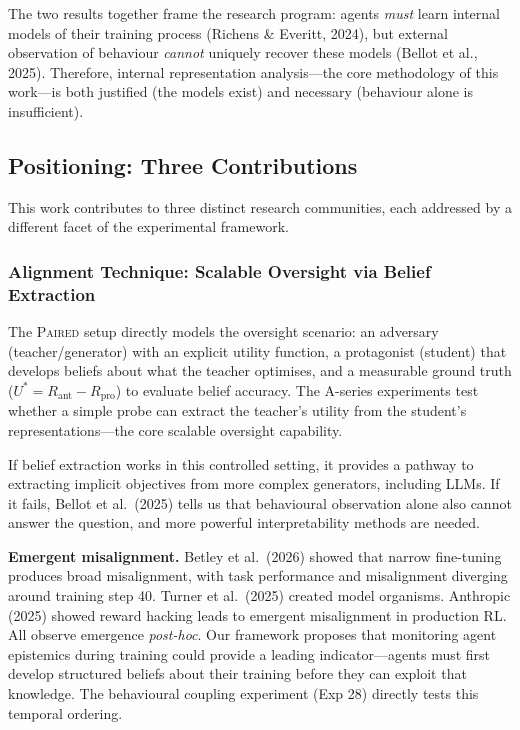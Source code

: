 \documentclass[11pt,a4paper]{article}
\theoremstyle{remark}
\newcommand{\paired}{\textsc{Paired}}
\newcommand{\Ustar}{U^*}
\newcommand{\Rpro}{R_{\text{pro}}}
\newcommand{\Rant}{R_{\text{ant}}}
\begin{document}
The two results together frame the research program: agents \textit{must} learn internal models of their training process (Richens \& Everitt, 2024), but external observation of behaviour \textit{cannot} uniquely recover these models (Bellot et al., 2025). Therefore, internal representation analysis---the core methodology of this work---is both justified (the models exist) and necessary (behaviour alone is insufficient).

\subsection{Positioning: Three Contributions}

This work contributes to three distinct research communities, each addressed by a different facet of the experimental framework.

\subsubsection{Alignment Technique: Scalable Oversight via Belief Extraction}

The \paired{} setup directly models the oversight scenario: an adversary (teacher/generator) with an explicit utility function, a protagonist (student) that develops beliefs about what the teacher optimises, and a measurable ground truth ($\Ustar = \Rant - \Rpro$) to evaluate belief accuracy. The A-series experiments test whether a simple probe can extract the teacher's utility from the student's representations---the core scalable oversight capability.

If belief extraction works in this controlled setting, it provides a pathway to extracting implicit objectives from more complex generators, including LLMs. If it fails, Bellot et al.\ (2025) tells us that behavioural observation alone also cannot answer the question, and more powerful interpretability methods are needed.

\textbf{Emergent misalignment.} Betley et al.\ (2026) showed that narrow fine-tuning produces broad misalignment, with task performance and misalignment diverging around training step 40. Turner et al.\ (2025) created model organisms. Anthropic (2025) showed reward hacking leads to emergent misalignment in production RL. All observe emergence \textit{post-hoc}. Our framework proposes that monitoring agent epistemics during training could provide a leading indicator---agents must first develop structured beliefs about their training before they can exploit that knowledge. The behavioural coupling experiment (Exp 28) directly tests this temporal ordering.
\end{document}
